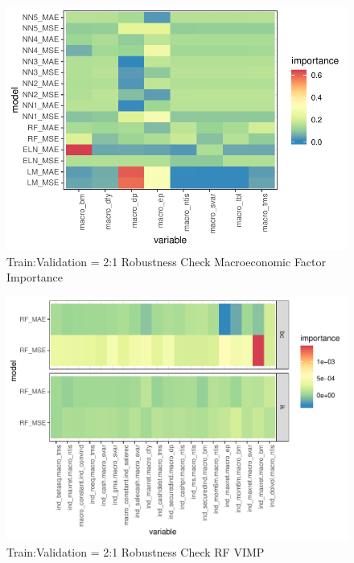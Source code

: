 \documentclass{article}
\begin{document}
\begin{figure}
	\includegraphics[]{../../Results/empirical_train_valid_2/empirical_sample_all_vi_macro.pdf}
	\caption{Train:Validation = 2:1 Robustness Check Macroeconomic Factor Importance}
\end{figure}


\begin{figure}
	\includegraphics[]{../../Results/empirical_train_valid_2/empirical_vimp.pdf}
	\caption{Train:Validation = 2:1 Robustness Check RF VIMP}
\end{figure}


\end{document}
